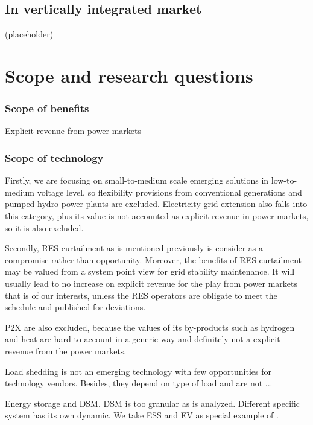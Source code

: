 
\subsection{In vertically integrated market}
(placeholder)
\newpage


\section{Scope and research questions}

\subsubsection{Scope of benefits}

Explicit revenue from power markets

\subsubsection{Scope of technology}

Firstly, we are focusing on small-to-medium scale emerging solutions in low-to-medium voltage level, so flexibility provisions from conventional generations and pumped hydro power plants are excluded. Electricity grid extension also falls into this category, plus its value is not accounted as explicit revenue in power markets, so it is also excluded.

Secondly, RES curtailment as is mentioned previously is consider as a compromise rather than opportunity. Moreover, the benefits of RES curtailment may be valued from a system point view for grid stability maintenance. It will usually lead to no increase on explicit revenue for the play from power markets that is of our interests, unless the RES operators are obligate to meet the schedule and published for deviations.

P2X are also excluded, because the values of its by-products such as hydrogen and heat are hard to account in a generic way and definitely not a explicit revenue from the power markets.

Load shedding is not an emerging technology with few opportunities for technology vendors. Besides, they depend on type of load and are not ...

Energy storage and DSM. DSM is too granular as is analyzed. Different specific system has its own dynamic. We take ESS and EV as special example of . 





